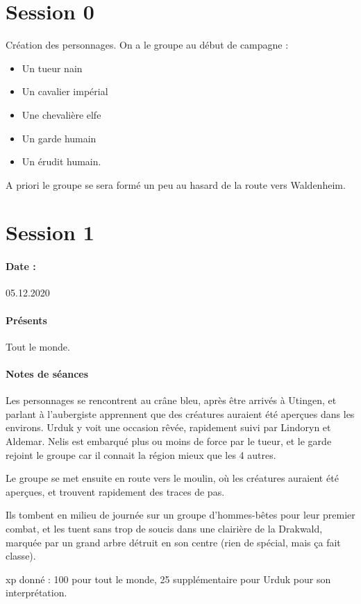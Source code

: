 \documentclass[10pt,a4paper]{book}
\begin{document}
\section{Session 0}
Création des personnages. On a le groupe au début de campagne :
\begin{itemize}
\item Un tueur nain
\item Un cavalier impérial
\item Une chevalière elfe
\item Un garde humain
\item Un érudit humain.
\end{itemize}
A priori le groupe se sera formé un peu au hasard de la route vers Waldenheim.
\section{Session 1}
\paragraph{Date :}05.12.2020
\paragraph{Présents} Tout le monde.

\paragraph{Notes de séances}
Les personnages se rencontrent au crâne bleu, après être arrivés à Utingen, et parlant à l'aubergiste apprennent que des créatures auraient été aperçues dans les environs. Urduk y voit une occasion rêvée, rapidement suivi par Lindoryn et Aldemar. Nelis est embarqué plus ou moins de force par le tueur, et le garde rejoint le groupe car il connait la région mieux que les 4 autres.

Le groupe se met ensuite en route vers le moulin, où les créatures auraient été aperçues, et trouvent rapidement des traces de pas.

Ils tombent en milieu de journée sur un groupe d'hommes-bêtes pour leur premier combat, et les tuent sans trop de soucis dans une clairière de la Drakwald, marquée par un grand arbre détruit en son centre (rien de spécial, mais ça fait classe).

xp donné : 100 pour tout le monde, 25 supplémentaire pour Urduk pour son interprétation.
\end{document}
